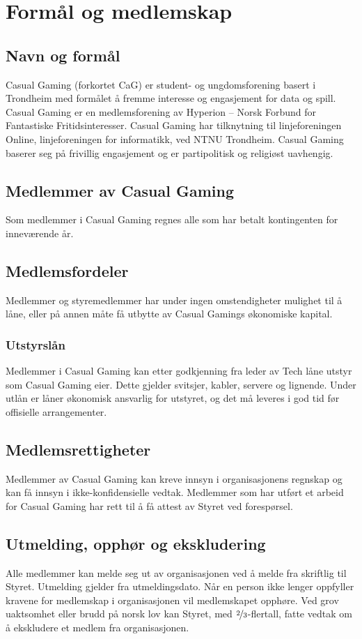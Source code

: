 \chapter{Formål og medlemskap}

\section{Navn og formål}
Casual Gaming (forkortet CaG) er student- og ungdomsforening basert i Trondheim med formålet å fremme interesse og engasjement for data og spill. Casual Gaming er en medlemsforening av Hyperion – Norsk Forbund for Fantastiske Fritidsinteresser. Casual Gaming har tilknytning til linjeforeningen Online, linjeforeningen for informatikk, ved NTNU Trondheim. Casual Gaming baserer seg på frivillig engasjement og er partipolitisk og religiøst uavhengig.

\section{Medlemmer av Casual Gaming}
Som medlemmer i Casual Gaming regnes alle som har betalt kontingenten for inneværende år.

\section{Medlemsfordeler}
Medlemmer og styremedlemmer har under ingen omstendigheter mulighet til å låne, eller på annen måte få utbytte av Casual Gamings økonomiske kapital.

\subsection{Utstyrslån}
Medlemmer i Casual Gaming kan etter godkjenning fra leder av Tech låne utstyr som Casual Gaming eier. Dette gjelder svitsjer, kabler, servere og lignende. Under utlån er låner økonomisk ansvarlig for utstyret, og det må leveres i god tid før offisielle arrangementer.

\section{Medlemsrettigheter}
Medlemmer av Casual Gaming kan kreve innsyn i organisasjonens regnskap og kan få innsyn i ikke-konfidensielle vedtak. Medlemmer som har utført et arbeid for Casual Gaming har rett til å få attest av Styret ved forespørsel.

\section{Utmelding, opphør og ekskludering}
Alle medlemmer kan melde seg ut av organisasjonen ved å melde fra skriftlig til Styret. Utmelding gjelder fra utmeldingsdato. Når en person ikke lenger oppfyller kravene for medlemskap i organisasjonen vil medlemskapet opphøre. Ved grov uaktsomhet eller brudd på norsk lov kan Styret, med $\nicefrac{2}{3}$-flertall, fatte vedtak om å ekskludere et medlem fra organisasjonen.
